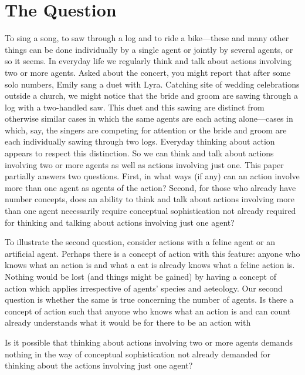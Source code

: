 \documentclass[12pt,a4paper]{extarticle}
\begin{document}
\section{The Question}
To sing a song, to saw through a log and to ride a bike---these and many other things can be done individually by a single agent or jointly by several agents, or so it seems. 
In everyday life we regularly think and talk about actions involving two or more agents.
Asked about the concert, you might report that after some solo numbers, Emily %
sang a duet with Lyra. %
Catching site of wedding celebrations outside a church, we might notice that the bride and groom are sawing through a log with a two-handled saw.
This duet and this sawing are distinct from otherwise similar cases in which the same agents are each acting alone---cases in which, say, the singers are competing for attention or the bride and groom are each individually sawing through two logs.
Everyday thinking about action appears to respect this distinction. 
So we can think and talk about actions involving two or more agents as well as actions involving just one.
This paper partially answers two questions.
First, in what ways (if any) can an action involve more than one agent as agents of the action?
Second, for those who already have number concepts, does an ability to think and talk about actions involving more than one agent necessarily require conceptual sophistication not already required for thinking and talking about actions involving just one agent?


To illustrate the second question, consider actions with a feline agent or an artificial agent.
Perhaps there is a concept of action with this feature: anyone who knows what an action is and what a cat is already knows what a feline action is.  
Nothing would be lost (and things might be gained) by having a concept of action which applies irrespective of agents' species and aeteology.
Our second question is whether the same is true concerning the number of agents.
Is there a concept of action such that anyone who knows what an action is and can count already understands what it would be for there to be an action with 

Is it possible that thinking about actions involving two or more agents demands nothing in the way of conceptual sophistication not already demanded for thinking about the actions involving just one agent?
\end{document}
